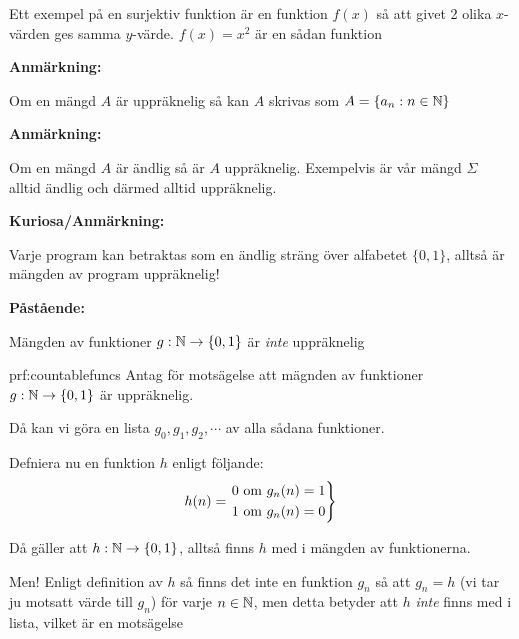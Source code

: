 \par\bigskip
\noindent Ett exempel på en surjektiv funktion är en funktion $f(x)$ så att givet 2 olika $x$-värden ges samma $y$-värde. $f(x)=x^2$ är en sådan funktion
\par\bigskip
\noindent\textbf{Anmärkning:}
\par
\noindent Om en mängd $A$ är uppräknelig så kan $A$ skrivas som $A = \{a_n:n\in\mathbb{N}\}$
\par\bigskip
\noindent\textbf{Anmärkning:}\par
\noindent Om en mängd $A$ är ändlig så är $A$ uppräknelig. Exempelvis är vår mängd $\Sigma$ alltid ändlig och därmed alltid uppräknelig.
\par\bigskip
\noindent\textbf{Kuriosa/Anmärkning:}\par
\noindent Varje program kan betraktas som en ändlig sträng över alfabetet $\{0,1\}$, alltså är mängden av program uppräknelig!
\par\bigskip
\noindent\textbf{Påstående:}\par
\noindent Mängden av funktioner $g:\mathbb{N}\to\{0,1\}$ är \textit{inte} uppräknelig
\par\bigskip
\begin{prf}{prf:countablefuncs}
  Antag för motsägelse att mägnden av funktioner $g:\mathbb{N}\to\{0,1\}$ är uppräknelig.\par
  \noindent Då kan vi göra en lista $g_0,g_1,g_2,\cdots$ av alla sådana funktioner.\par
  \noindent Defniera nu en funktion $h$ enligt följande:
  \begin{equation*}
    \begin{gathered}
      h(n) = 
      \begin{rcases*}
        0\text{ om } g_n(n) = 1\\
        1\text{ om } g_n(n) = 0
      \end{rcases*}
    \end{gathered}
  \end{equation*}
  \par\bigskip
  \noindent Då gäller att $h:\mathbb{N}\to\{0,1\}$, alltså finns $h$ med i mängden av funktionerna.\par
  \noindent Men! Enligt definition av $h$ så finns det inte en funktion $g_n$ så att $g_n = h$ (vi tar ju motsatt värde till $g_n$) för varje $n\in\mathbb{N}$, men detta betyder att $h$ \textit{inte} finns med i lista, vilket är en motsägelse 
\end{prf}
\par\bigskip
